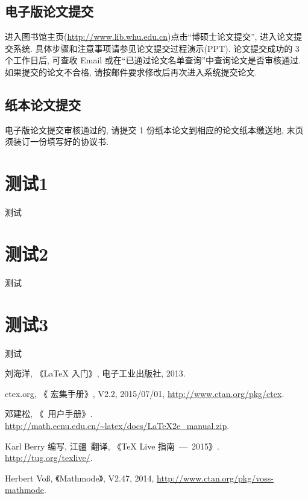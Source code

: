 \documentclass{WHUPhd}  %
\begin{document}
\section*{电子版论文提交}

    进入图书馆主页(\url{http://www.lib.whu.edu.cn})点击``博硕士论文提交'', 进入论文提交系统.
    具体步骤和注意事项请参见论文提交过程演示(PPT).
    论文提交成功的 3 个工作日后, 可查收 Email 或在``已通过论文名单查询''中查询论文是否审核通过.
    如果提交的论文不合格, 请按邮件要求修改后再次进入系统提交论文.


\section*{纸本论文提交}

    电子版论文提交审核通过的, 请提交 1 份纸本论文到相应的论文纸本缴送地,
    末页须装订一份填写好的协议书.

\appendix

\chapter{测试1}

测试

\chapter{测试2}

测试

\chapter{测试3}

测试


\cleardoublepage{}
{}
\begin{thebibliography}{000}

   刘海洋, 《\LaTeX{} 入门》, 电子工业出版社, 2013.

   ctex.org, 《\CTeX{} 宏集手册》, V2.2, 2015/07/01, \url{http://www.ctan.org/pkg/ctex}.

   邓建松, 《\LaTeXe~用户手册》.
             \url{http://math.ecnu.edu.cn/~latex/docs/LaTeX2e_manual.zip}.

   Karl Berry 编写, 江疆~翻译, 《\TeX{} Live 指南\ —\ 2015》.
              \url{http://tug.org/texlive/}.

   Herbert Vo\ss, 《Mathmode》, V2.47, 2014, \url{http://www.ctan.org/pkg/voss-mathmode}.

\end{thebibliography}




\backmatter


\cleardoublepage
\end{document}
